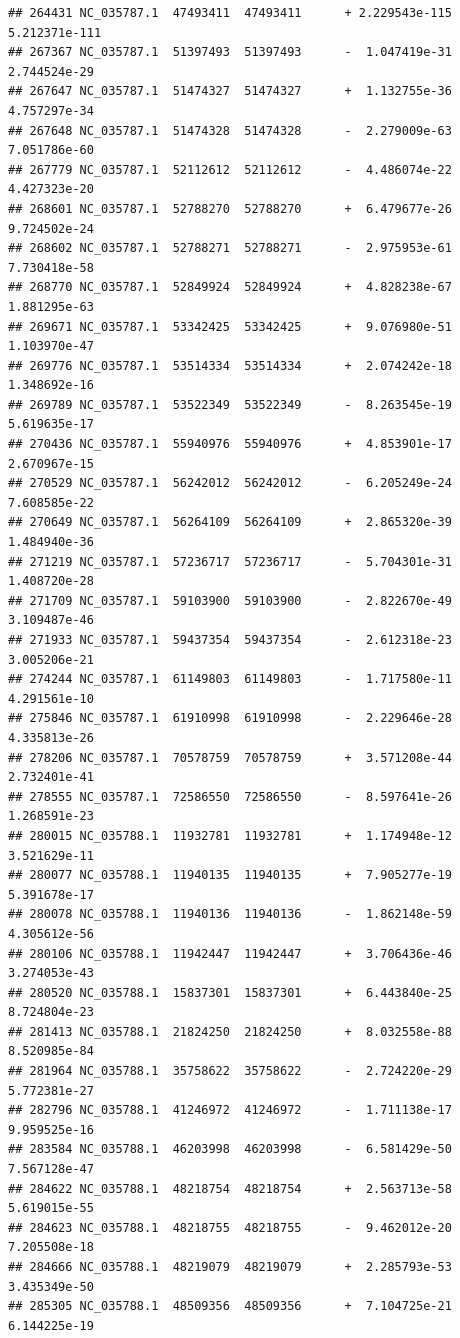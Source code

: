 \documentclass[]{article}
\begin{document}
\begin{verbatim}
## 264431 NC_035787.1  47493411  47493411      + 2.229543e-115 5.212371e-111
## 267367 NC_035787.1  51397493  51397493      -  1.047419e-31  2.744524e-29
## 267647 NC_035787.1  51474327  51474327      +  1.132755e-36  4.757297e-34
## 267648 NC_035787.1  51474328  51474328      -  2.279009e-63  7.051786e-60
## 267779 NC_035787.1  52112612  52112612      -  4.486074e-22  4.427323e-20
## 268601 NC_035787.1  52788270  52788270      +  6.479677e-26  9.724502e-24
## 268602 NC_035787.1  52788271  52788271      -  2.975953e-61  7.730418e-58
## 268770 NC_035787.1  52849924  52849924      +  4.828238e-67  1.881295e-63
## 269671 NC_035787.1  53342425  53342425      +  9.076980e-51  1.103970e-47
## 269776 NC_035787.1  53514334  53514334      +  2.074242e-18  1.348692e-16
## 269789 NC_035787.1  53522349  53522349      -  8.263545e-19  5.619635e-17
## 270436 NC_035787.1  55940976  55940976      +  4.853901e-17  2.670967e-15
## 270529 NC_035787.1  56242012  56242012      -  6.205249e-24  7.608585e-22
## 270649 NC_035787.1  56264109  56264109      +  2.865320e-39  1.484940e-36
## 271219 NC_035787.1  57236717  57236717      -  5.704301e-31  1.408720e-28
## 271709 NC_035787.1  59103900  59103900      -  2.822670e-49  3.109487e-46
## 271933 NC_035787.1  59437354  59437354      -  2.612318e-23  3.005206e-21
## 274244 NC_035787.1  61149803  61149803      -  1.717580e-11  4.291561e-10
## 275846 NC_035787.1  61910998  61910998      -  2.229646e-28  4.335813e-26
## 278206 NC_035787.1  70578759  70578759      +  3.571208e-44  2.732401e-41
## 278555 NC_035787.1  72586550  72586550      -  8.597641e-26  1.268591e-23
## 280015 NC_035788.1  11932781  11932781      +  1.174948e-12  3.521629e-11
## 280077 NC_035788.1  11940135  11940135      +  7.905277e-19  5.391678e-17
## 280078 NC_035788.1  11940136  11940136      -  1.862148e-59  4.305612e-56
## 280106 NC_035788.1  11942447  11942447      +  3.706436e-46  3.274053e-43
## 280520 NC_035788.1  15837301  15837301      +  6.443840e-25  8.724804e-23
## 281413 NC_035788.1  21824250  21824250      +  8.032558e-88  8.520985e-84
## 281964 NC_035788.1  35758622  35758622      -  2.724220e-29  5.772381e-27
## 282796 NC_035788.1  41246972  41246972      -  1.711138e-17  9.959525e-16
## 283584 NC_035788.1  46203998  46203998      -  6.581429e-50  7.567128e-47
## 284622 NC_035788.1  48218754  48218754      +  2.563713e-58  5.619015e-55
## 284623 NC_035788.1  48218755  48218755      -  9.462012e-20  7.205508e-18
## 284666 NC_035788.1  48219079  48219079      +  2.285793e-53  3.435349e-50
## 285305 NC_035788.1  48509356  48509356      +  7.104725e-21  6.144225e-19

\end{verbatim}
\end{document}
